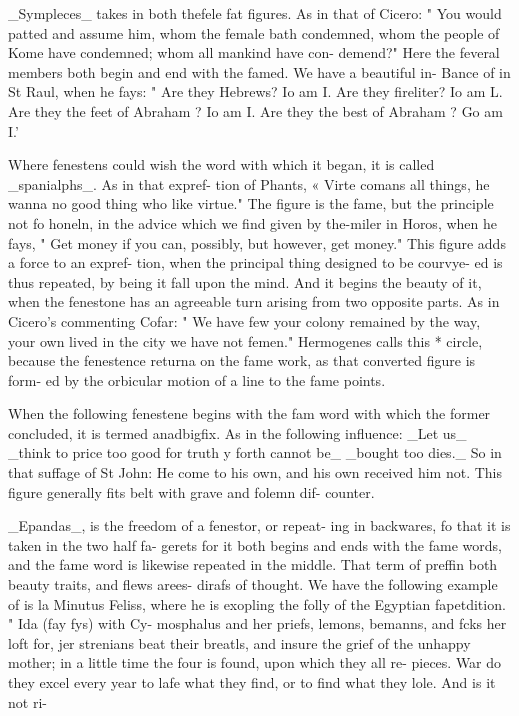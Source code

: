 \documentclass{article}
\begin{document}
\_Sympleces\_ takes in both thefele fat figures. As in that
of Cicero: " You would patted and assume him,
whom the female bath condemned, whom the people of
Kome have condemned; whom all mankind have con-
demend?" Here the feveral members both begin and
end with the famed. We have a beautiful in-
Bance of in St Raul, when he fays: " Are they
Hebrews? Io am I. Are they fireliter? Io am L.
Are they the feet of Abraham ? Io am I.
Are they the best of Abraham ? Go am I.’

Where fenestens could wish the word with which
it began, it is called \_spanialphs\_. As in that expref-
tion of Phants, « Virte comans all things, he wanna
no good thing who like virtue." The figure is the
fame, but the principle not fo honeln, in the advice
which we find given by the-miler in Horos, when he
fays, " Get money if you can, possibly, but however,
get money." This figure adds a force to an expref-
tion, when the principal thing designed to be courvye-
ed is thus repeated, by being it fall upon the mind.
And it begins the beauty of it, when the fenestone
has an agreeable turn arising from two opposite parts.
As in Cicero's commenting Cofar: " We have few
your colony remained by the way, your own
lived in the city we have not femen." Hermogenes
calls this * circle, because the fenestence returna
on the fame work, as that converted figure is form-
ed by the orbicular motion of a line to the fame
points.

When the following fenestene begins with the fam
word with which the former concluded, it is termed
anadbigfix. As in the following influence: \_Let us\_
\_think to price too good for truth y forth cannot be\_
\_bought too dies.\_ So in that suffage of St John: He
come to his own, and his own received him not. This
figure generally fits belt with grave and folemn dif-
counter.

\_Epandas\_, is the freedom of a fenestor, or repeat-
ing in backwares, fo that it is taken in the two half fa-
gerets for it both begins and ends with the fame words,
and the fame word is likewise repeated in the middle.
That term of preffin both beauty traits, and flews arees-
dirafs of thought. We have the following example of is
la Minutus Feliss, where he is exopling the folly of the
Egyptian fapetdition. " Ida (fay fys) with Cy-
mosphalus and her priefs, lemons, bemanns, and
fcks her loft for, jer strenians beat their breatls,
and insure the grief of the unhappy mother; in a
little time the four is found, upon which they all re-
pieces. War do they excel every year to lafe what
they find, or to find what they lole. And is it not ri-
\end{document}
